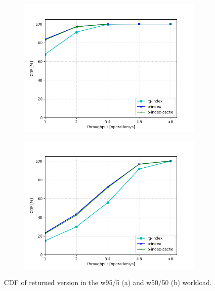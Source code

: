 \begin{figure}[H]
  \begin{subfigure}{0.5\textwidth}
    \includegraphics[width=\linewidth]{./figures/evaluation/freshness_cdf_9505.png}
    \caption{}
    \label{fig:freshness_cdf_9505}
  \end{subfigure}%
  \hspace*{\fill}
  \begin{subfigure}{0.5\textwidth}
    \includegraphics[width=\linewidth]{./figures/evaluation/freshness_cdf_5050.png}
    \caption{}
    \label{fig:freshness_cdf_5050}
  \end{subfigure}%
  \caption{CDF of returned version in the w95/5 (a) and w50/50 (b) workload.}
  \label{fig:ycsb_freshness_cdf}
\end{figure}

